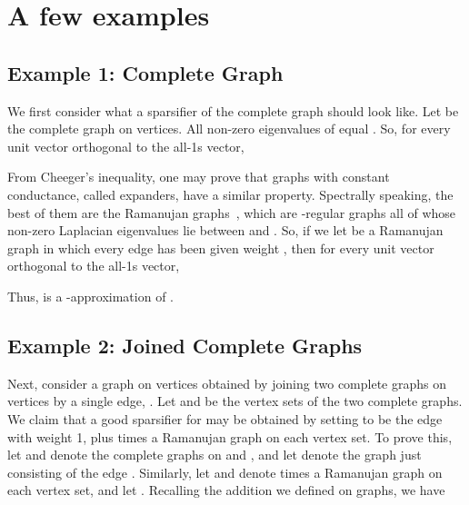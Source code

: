 \documentclass[11pt]{article}
\begin{document}
\section{A few examples}\label{sec:examples}

\subsection{Example 1: Complete Graph}
\begin{figure}[h]
\centering
{}
\quad
{}
\end{figure}

We first consider what a sparsifier of the complete graph should look like.
Let  be the complete graph on  vertices.
All non-zero eigenvalues of  equal .
So, for every unit vector  orthogonal to the all-1s vector,

From Cheeger's inequality, one may prove that graphs with constant conductance, called expanders,
  have a similar property.
Spectrally speaking, the best of them
  are the Ramanujan graphs~\cite{LPS,Margulis}, which are -regular
  graphs
  all of whose non-zero Laplacian eigenvalues lie between 
   and .
So, if we let  be a Ramanujan graph in which every edge has been given weight ,
  then for every unit vector  orthogonal to the all-1s vector,

Thus,  is a -approximation of .

\subsection{Example 2: Joined Complete Graphs}

\begin{figure}[h]
\centering
{} \quad
{}
\end{figure}


Next, consider a graph on  vertices obtained by joining two complete graphs
  on  vertices
  by a single edge, .
Let  and  be the vertex sets of the two complete graphs.
We claim that a good sparsifier for  may be obtained by setting  to be
  the edge  with weight 1, plus  times a Ramanujan graph on each vertex set.
To prove this, let  and  denote the complete graphs on  and ,
  and let  denote the graph just consisting of the edge .
Similarly, let  and  denote  times a Ramanujan graph on each
  vertex set, and let .
Recalling the addition we defined on graphs, we have
\end{document}
